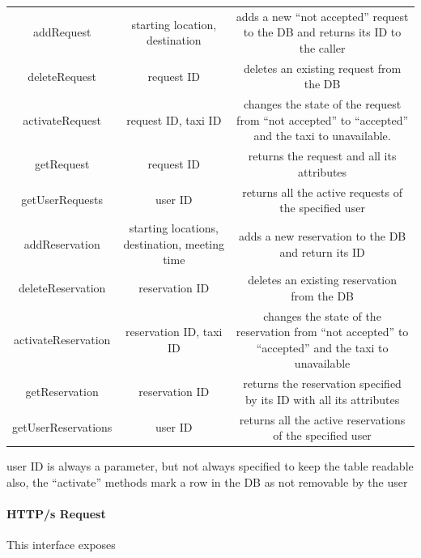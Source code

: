 \documentclass{article}
\begin{document}
\begin{itemize}
\begin{table}[H]
\begin{adjustbox}{width=1.2\textwidth}
\begin{tabular}{*{3}{c}}
			\midrule
			addRequest & starting location, destination & adds a new ``not accepted'' request to the DB and returns its ID to the caller\\ 
			deleteRequest & request ID & deletes an existing request from the DB\\ 
			activateRequest & request ID, taxi ID & changes the state of the request from ``not accepted'' to ``accepted'' and the taxi to unavailable.\\
			getRequest & request ID & returns the request and all its attributes\\
			getUserRequests& user ID & returns all the active requests of the specified user \\
			addReservation & starting locations, destination, meeting time & adds a new reservation to the DB and return its ID\\
			deleteReservation & reservation ID & deletes an existing reservation from the DB\\
			activateReservation & reservation ID, taxi ID & changes the state of the reservation from ``not accepted'' to ``accepted'' and the taxi to unavailable\\
			getReservation & reservation ID & returns the reservation specified by its ID with all its attributes\\
			getUserReservations & user ID & returns all the active reservations of the specified user \\ 
			\bottomrule
		\end{tabular}	
	\end{adjustbox}
\end{table}
user ID is always a parameter, but not always specified to keep the table readable\\
also, the ``activate'' methods mark a row in the DB as not removable by the user
\end{itemize}
\paragraph{HTTP/s Request}
This interface exposes  %
\end{document}
